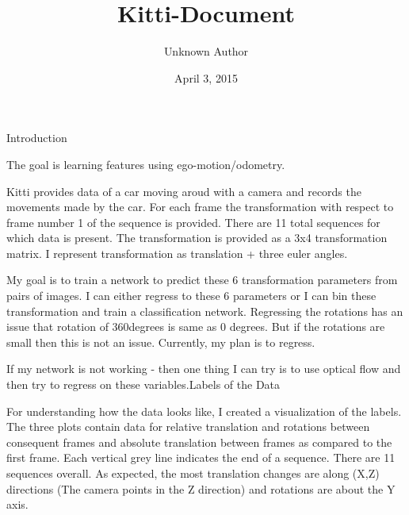 \documentclass[letterpaper,10pt,english]{/usr/share/sphinx/texinputs/sphinxhowto}
\title{Kitti-Document}
\date{April 3, 2015}
\author{Unknown Author}
\begin{document}
        
            \maketitle
        

        


        
        Introduction

The goal is learning features using ego-motion/odometry.

Kitti provides data of a car moving aroud with a camera and records the
movements made by the car. For each frame the transformation with
respect to frame number 1 of the sequence is provided. There are 11
total sequences for which data is present. The transformation is
provided as a 3x4 transformation matrix. I represent transformation as
translation + three euler angles.

My goal is to train a network to predict these 6 transformation
parameters from pairs of images. I can either regress to these 6
parameters or I can bin these transformation and train a classification
network. Regressing the rotations has an issue that rotation of
360degrees is same as 0 degrees. But if the rotations are small then
this is not an issue. Currently, my plan is to regress.

If my network is not working - then one thing I can try is to use
optical flow and then try to regress on these variables.Labels of the Data

For understanding how the data looks like, I created a visualization of
the labels. The three plots contain data for relative translation and
rotations between consequent frames and absolute translation between
frames as compared to the first frame. Each vertical grey line indicates
the end of a sequence. There are 11 sequences overall. As expected, the
most translation changes are along (X,Z) directions (The camera points
in the Z direction) and rotations are about the Y axis.

\end{document}
